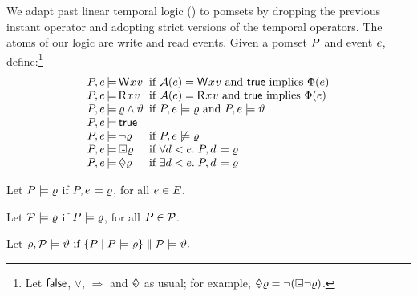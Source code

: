 We adapt past linear temporal logic (\pLTL)
\cite{Lichtenstein:1985:GP:648065.747612} to pomsets by dropping the previous
instant operator and adopting strict versions of the temporal operators.
The atoms of our logic are write and read events.
Given a pomset $P$ and event $e$, define:\footnote{Let $\mathsf{false}$, $\lor$,
  $\Rightarrow$ and $\Diamond\mkern-10.1mu\text{-}\mkern4mu$ as usual;
  for example,
  $\Diamond\mkern-10.1mu\text{-}\mkern4mu\varrho = \lnot(\Box\mkern-8.8mu\text{-}\mkern3mu\lnot\varrho)$.}
\begin{displaymath}
  \renewcommand{\arraycolsep}{.2ex}
    \begin{array}{lrll}
      \aPS,\aEv &\models& \DW{\aLoc}{\aVal} &\text{ if } \labelingAct(\aEv) = \DW{\aLoc}{\aVal} \text{ and } \TRUE \text{ implies } \labelingForm(\aEv) \\
      \aPS,\aEv &\models& \DR{\aLoc}{\aVal} &\text{ if } \labelingAct(\aEv) = \DR{\aLoc}{\aVal} \text{ and } \TRUE \text{ implies } \labelingForm(\aEv) \\
      \aPS,\aEv &\models& \afo\land\bfo &\text{ if } \aPS,\aEv \models  \afo \text{ and } \aPS,\aEv \models  \bfo \\
      \aPS,\aEv &\models& \TRUE\\
      \aPS,\aEv &\models& \lnot\afo &\text{ if } \aPS,\aEv \not\models \afo \\
      \aPS,\aEv &\models& \always\afo &\text{ if } \forall \bEv \lt \aEv.\; \aPS,\bEv \models \afo\\
      \aPS,\aEv &\models& \once\afo &\text{ if } \exists \bEv \lt \aEv.\;  \aPS,\bEv \models \afo 
    \end{array} 
  \end{displaymath}

  Let $P \models \varrho$ if
  $P,e \models\varrho$, for all $e \in E$.

  Let $\mathcal{P}\models \varrho$
  if $P \models\varrho$, for all $P \in \mathcal{P}$.
  
Let
  \begin{math}
    \varrho, \mathcal{P} \models \vartheta  \text{ if } \{ P \mid P \models \varrho \} \parallel \mathcal{P} \models \vartheta.
  \end{math}

